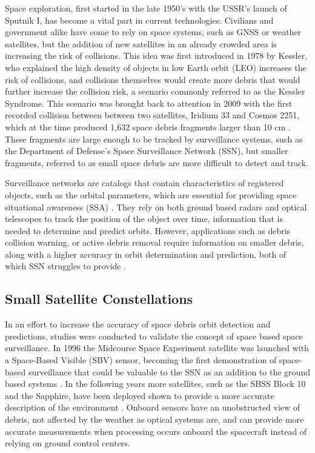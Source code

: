 \documentclass[conference]{IEEEtran}
\begin{document}
		Space exploration, first started in the late 1950's with the USSR's launch of Sputnik I, has become a vital part in current technologies.
		Civilians and government alike have come to rely on space systems, such as GNSS or weather satellites, but the addition of new satellites in an already crowded area is increasing the risk of collisions. 
		This idea was first introduced in 1978 by Kessler, who explained the high density of objects in low Earth orbit (LEO) increases the risk of collisions, and collisions themselves would create more debris that would further increase the collision risk, a scenario commonly referred to as the Kessler Syndrome.
		This scenario was brought back to attention in 2009 with the first recorded collision between between two satellites, Iridium 33 and Cosmos 2251, which at the time produced 1,632 space debris fragments larger than 10 cm \cite{Wang2010AnalysisOD}. These fragments are large enough to be tracked by surveillance systems, such as the Department of Defense’s Space Surveillance Network (SSN), but smaller fragments, referred to as small space debris are more difficult to detect and track. 
		
		Surveillance networks are catalogs that contain characteristics of registered objects, such as the orbital parameters, which are essential for providing space situational awareness (SSA) \cite{2019_lidar}.
		They rely on both ground based radars and optical telescopes to track the position of the object over time, information that is needed to determine and predict orbits.
		However, applications such as debris collision warning, or active debris removal require information on smaller debris, along with a higher accuracy in orbit determination and prediction, both of which SSN struggles to provide \cite{2020_ml_approach}.
		
	
	\subsection{Small Satellite Constellations}
		In an effort to increase the accuracy of space debris orbit detection and predictions, studies were conducted to validate the concept of space based space surveillance. In 1996 the Midcourse Space Experiment satellite was launched with a Space-Based Visible (SBV) sensor, becoming the first demonstration of space-based surveillance that could be valuable to the SSN as an addition to the ground based systems \cite{stokes2000space}. In the following years more satellites, such as the SBSS Block 10 and the Sapphire, have been deployed shown to provide a more accurate description of the environment  \cite{multi_spacecraft_2016}. 
		Onboard sensors have an unobstructed view of debris, not affected by the weather as optical systems are, and can provide more accurate measurements when processing occurs onboard the spacecraft instead of relying on ground control centers.
		
\end{document}
